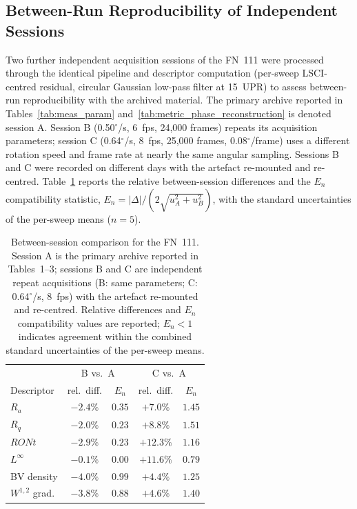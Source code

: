 \documentclass[review]{elsarticle}
\begin{document}
\subsection{Between-Run Reproducibility of Independent Sessions}
\label{sec:between_run}
Two further independent acquisition sessions of the FN~111 were processed through the identical pipeline and descriptor computation (per-sweep LSCI-centred residual, circular Gaussian low-pass filter at 15~UPR) to assess between-run reproducibility with the archived material. The primary archive reported in Tables~\ref{tab:meas_param} and~\ref{tab:metric_phase_reconstruction} is denoted session A. Session B (0.50$^\circ$/s, 6~fps, 24,000 frames) repeats its acquisition parameters; session C (0.64$^\circ$/s, 8~fps, 25,000 frames, 0.08$^\circ$/frame) uses a different rotation speed and frame rate at nearly the same angular sampling. Sessions B and C were recorded on different days with the artefact re-mounted and re-centred. Table~\ref{tab:between_run} reports the relative between-session differences and the $E_n$ compatibility statistic, $E_n=|\Delta|/(2\sqrt{u_A^2+u_B^2})$, with the standard uncertainties of the per-sweep means ($n=5$).

\begin{table}[htbp]
\centering
\footnotesize
\caption{Between-session comparison for the FN~111. Session A is the primary archive reported in Tables~1--3; sessions B and C are independent repeat acquisitions (B: same parameters; C: 0.64$^\circ$/s, 8~fps) with the artefact re-mounted and re-centred. Relative differences and $E_n$ compatibility values are reported; $E_n<1$ indicates agreement within the combined standard uncertainties of the per-sweep means.}
\label{tab:between_run}
\begin{tabular}{lcc|cc}
\toprule
& \multicolumn{2}{c}{B vs.\ A} & \multicolumn{2}{c}{C vs.\ A} \\
Descriptor & rel.\ diff. & $E_n$ & rel.\ diff. & $E_n$ \\
\midrule
$R_a$ & $-2.4\%$ & $0.35$ & $+7.0\%$ & $1.45$ \\
$R_q$ & $-2.0\%$ & $0.23$ & $+8.8\%$ & $1.51$ \\
$RONt$ & $-2.9\%$ & $0.23$ & $+12.3\%$ & $1.16$ \\
$L^{\infty}$ & $-0.1\%$ & $0.00$ & $+11.6\%$ & $0.79$ \\
BV density & $-4.0\%$ & $0.99$ & $+4.4\%$ & $1.25$ \\
$W^{1,2}$ grad. & $-3.8\%$ & $0.88$ & $+4.6\%$ & $1.40$ \\
\bottomrule
\end{tabular}
\end{table}
\end{document}
